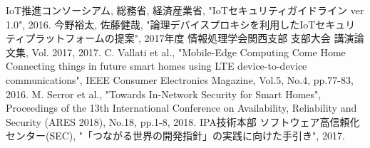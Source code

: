 \documentclass[a4paper,10pt,twocolumn,uplatex]{jsarticle}
\begin{document}
\footnotesize{
  \begin{thebibliography}{99}
     IoT推進コンソーシアム, 総務省, 経済産業省, "IoTセキュリティガイドライン ver 1.0", 2016.
     今野裕太, 佐藤健哉, "論理デバイスプロキシを利用したIoTセキュリティプラットフォームの提案", 2017年度 情報処理学会関西支部 支部大会 講演論文集, Vol. 2017, 2017.
     C. Vallati et al., "Mobile-Edge Computing Come Home Connecting things in future smart homes using LTE device-to-device communications", IEEE Consumer Electronics Magazine, Vol.5, No.4, pp.77-83, 2016.
     M. Serror et al., "Towards In-Network Security for Smart Homes", Proceedings of the 13th International Conference on Availability, Reliability and Security (ARES 2018), No.18, pp.1-8, 2018.
     IPA技術本部 ソフトウェア高信頼化センター(SEC), "「つながる世界の開発指針」の実践に向けた手引き", 2017.
  \end{thebibliography}
}

\end{document}
